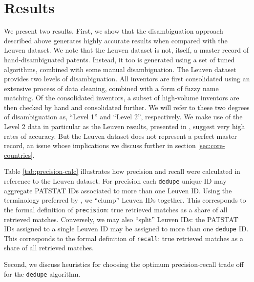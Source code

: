 \documentclass[11pt]{article}
\begin{document}

\section{Results}
\label{sec:results}


We present two results. First, we show that the disambiguation
approach described above generates highly accurate results when
compared with the Leuven dataset. We note that the Leuven dataset is
not, itself, a master record of hand-disambiguated patents. Instead,
it too is generated using a set of tuned algorithms, combined with
some manual disambiguation. The Leuven dataset provides two levels of
disambiguation. All inventors are first consolidated using an
extensive process of data cleaning, combined with a form of fuzzy name
matching. Of the consolidated inventors, a subset of high-volume
inventors are then checked by hand and consolidated further. We will
refer to these two degrees of disambiguation as, ``Level 1'' and
``Level 2'', respectively. We make use of the Level 2 data in
particular as the Leuven results, presented in
\cite{callaert2011patent}, suggest very high rates of
accuracy. But the Leuven dataset does not represent a perfect master
record, an issue whose implications we discuss further in section
\ref{sec:core-countries}. 

Table \ref{tab:precision-calc} illustrates how precision and recall
were calculated in reference to the Leuven dataset. For precision each
\texttt{dedupe} unique ID may aggregate PATSTAT IDs associated to more
than one Leuven ID. Using the terminology preferred by
\cite{lai2011disambiguation}, we ``clump'' Leuven IDs together. This
corresponds to the formal definition of \texttt{precision}: true
retrieved matches as a share of all retrieved matches. Conversely, we may also ``split''
Leuven IDs: the PATSTAT IDs assigned to a single Leuven ID may be
assigned to more than one \texttt{dedupe} ID. This corresponds to the
formal definition of \texttt{recall}: true retrieved matches as a
share of all retrieved matches.

Second, we discuss heuristics for choosing the optimum
precision-recall trade off for the \texttt{dedupe} algorithm. 
\end{document}
